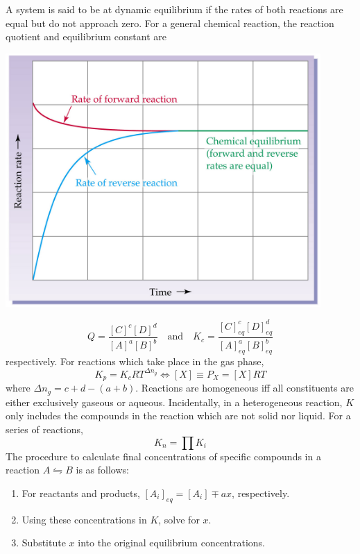 \documentclass{tufte-book}
\begin{document}
A system is said to be at dynamic equilibrium if the rates of both reactions are equal but do not approach zero. For a general chemical reaction, the reaction quotient and equilibrium constant are
%
\begin{marginfigure}[5mm]
\begin{center}
  \includegraphics[width=0.9\textwidth]{equilibrium} \phantom{m}
\end{center}
\end{marginfigure}
%
\begin{equation}
  Q = \frac{[C]^c [D]^d}{[A]^a [B]^b} \quad\text{and}\quad K_c = \frac{[C]^c_{eq} [D]^d_{eq}}{[A]^a_{eq} [B]^b_{eq}}
\end{equation}
respectively. For reactions which take place in the gas phase, \begin{equation}
  K_p = K_c RT^{\Delta n_g} \iff [X] \equiv P_X = [X]RT
\end{equation}
where $\Delta n_g = c+d-(a+b)$. Reactions are homogeneous iff all constituents are either exclusively gaseous or aqueous. Incidentally, in a heterogeneous reaction, $K$ only includes the compounds in the reaction which are not solid nor liquid. For a series of reactions, \begin{equation}
  K_n = \prod K_i
\end{equation}
The procedure to calculate final concentrations of specific compounds in a reaction $A \leftrightharpoons B$ is as follows:
\begin{enumerate}
  \item For reactants and products, $[A_i]_{eq} = [A_i] \mp ax$, respectively.
  \item Using these concentrations in $K$, solve for $x$.
  \item Substitute $x$ into the original equilibrium concentrations.
\end{enumerate}
\end{document}
